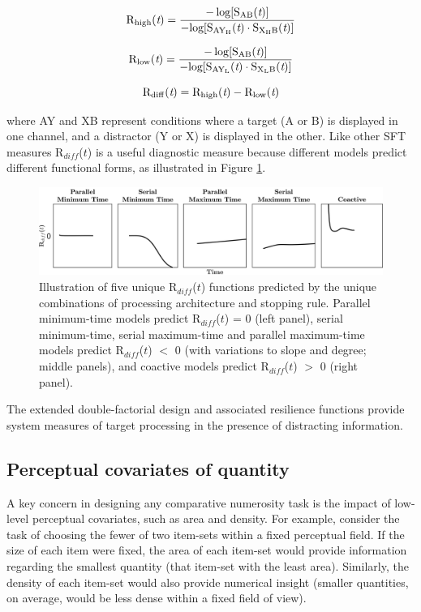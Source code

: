 \begin{equation}
	\rm R_{high}({\rm \textit{t}}) = \frac{-\log[S_{AB}({\rm \textit{t}})] }{ -log[ S_{AY_H}({\rm \textit{t}}) \cdot S_{X_HB}({\rm \textit{t}}) ] }
    \label{eq:Rhigh}
\end{equation}

\begin{equation}
    \rm R_{low}({\rm \textit{t}}) = \frac{-\log[S_{AB}({\rm \textit{t}})] }{ -log[ S_{AY_L}({\rm \textit{t}}) \cdot S_{X_LB}({\rm \textit{t}}) ] }
    \label{eq:Rlow}
\end{equation}

\begin{equation}
	\rm R_{diff}({\rm \textit{t}}) =  R_{high}({\rm \textit{t}}) - R_{low}({\rm \textit{t}})
	\label{eq:Rdiff}
\end{equation}

\noindent where AY and XB represent conditions where a target (A or B) is displayed in one channel, and a distractor (Y or X) is displayed in the other. Like other SFT measures R$_{diff}$($t$) is a useful diagnostic measure because different models predict different functional forms, as illustrated in Figure \ref{fig:Rd}.

\begin{figure}[htb]
\centering \includegraphics[scale = .37]{Figures/EstSystems/FIG3JPG.png}
\caption{Illustration of five unique R$_{diff}$($t$) functions predicted by the unique combinations of processing architecture and stopping rule. Parallel minimum-time models predict R$_{diff}$($t$) = 0 (left panel), serial minimum-time, serial maximum-time and parallel maximum-time models predict R$_{diff}$($t$) $<$ 0 (with variations to slope and degree; middle panels), and coactive models predict R$_{diff}$($t$) $>$ 0 (right panel).}
\label{fig:Rd}
\end{figure}
\color{black}

The extended double-factorial design and associated resilience functions provide system measures of target processing in the presence of distracting information. 

\subsection{Perceptual covariates of quantity}
A key concern in designing any comparative numerosity task is the impact of low-level perceptual covariates, such as area and density. For example, consider the task of choosing the fewer of two item-sets within a fixed perceptual field. If the size of each item were fixed, the area of each item-set would provide information regarding the smallest quantity (\ie that item-set with the least area). Similarly, the density of each item-set would also provide numerical insight (\ie smaller quantities, on average, would be less dense within a fixed field of view). 

